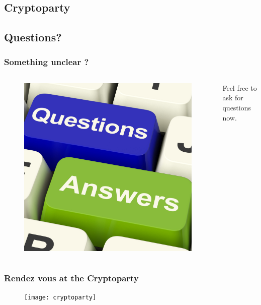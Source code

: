 \documentclass{beamer}
\begin{document}
\subsection{Cryptoparty}
\begin{frame}
\end{frame}

\subsection{Questions?}
\begin{frame}
\frametitle{Something unclear ?}
\begin{columns}[c]
\begin{figure}
\includegraphics[width=0.8\linewidth]{questions}
\end{figure}
Feel free to ask for questions now.
\end{columns}
\end{frame}

\begin{frame}
\frametitle{Rendez vous at the Cryptoparty}
\begin{figure}
\texttt{[image: cryptoparty]}
\end{figure}
\end{frame}
\end{document}
